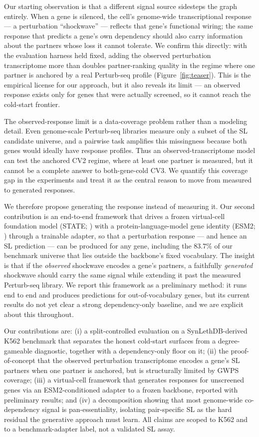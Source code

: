 Our starting observation is that a different signal source sidesteps the graph
entirely. When a gene is silenced, the cell's genome-wide transcriptional
response --- a perturbation ``shockwave'' --- reflects that gene's functional
wiring; the same response that predicts a gene's own dependency
\citep{chiu2021deepdep, haider2025transcriptomic} should also carry information
about the partners whose loss it cannot tolerate. We confirm this directly: with
the evaluation harness held fixed, adding the observed perturbation transcriptome
more than doubles partner-ranking quality in the regime where one partner is
anchored by a real Perturb-seq profile (Figure~\ref{fig:teaser}). This is the
empirical license for our approach, but it also reveals its limit --- an observed
response exists only for genes that were actually screened, so it cannot reach
the cold-start frontier.

The observed-response limit is a data-coverage problem rather than a modeling
detail. Even genome-scale Perturb-seq libraries measure only a subset of the SL
candidate universe, and a pairwise task amplifies this missingness because both
genes would ideally have response profiles. Thus an observed-transcriptome model
can test the anchored CV2 regime, where at least one partner is measured, but it
cannot be a complete answer to both-gene-cold CV3. We quantify this coverage gap
in the experiments and treat it as the central reason to move from measured to
generated responses.

We therefore propose generating the response instead of measuring it. Our second
contribution is an end-to-end framework that drives a frozen virtual-cell
foundation model (STATE; \citealp{adduri2025state}) with a protein-language-model
gene identity (ESM2; \citealp{lin2023esm2}) through a trainable adapter, so that a
perturbation response --- and hence an SL prediction --- can be produced for any
gene, including the $83.7\%$ of our benchmark universe that lies outside the
backbone's fixed vocabulary. The insight is that if the \emph{observed} shockwave
encodes a gene's partners, a faithfully \emph{generated} shockwave should carry
the same signal while extending it past the measured Perturb-seq library. We
report this framework as a preliminary method: it runs end to end and produces
predictions for out-of-vocabulary genes, but its current results do not yet clear
a strong dependency-only baseline, and we are explicit about this throughout.

Our contributions are: (i) a split-controlled evaluation on a SynLethDB-derived
K562 benchmark that separates the honest cold-start surfaces from a degree-gameable
diagnostic, together with a dependency-only floor on it; (ii) the proof-of-concept
that the observed perturbation transcriptome encodes a gene's SL partners when one
partner is anchored, but is structurally limited by GWPS coverage; (iii) a
virtual-cell framework that generates responses for unscreened genes via an
ESM2-conditioned adapter to a frozen backbone, reported with preliminary results;
and (iv) a decomposition showing that most genome-wide co-dependency signal is
pan-essentiality, isolating pair-specific SL as the hard residual the generative
approach must learn. All claims are scoped to K562 and to a benchmark-adapter
label, not a validated SL assay.
